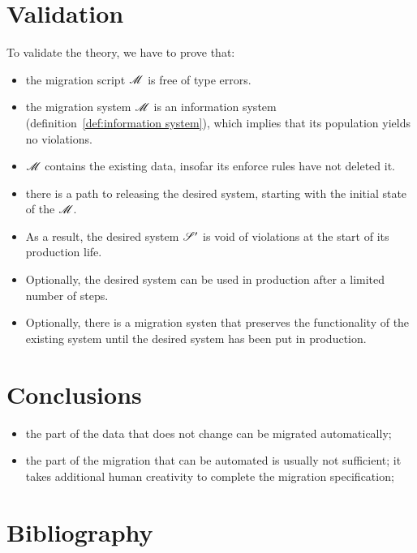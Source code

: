 \documentclass{elsarticle}
\begin{document}
\section{Validation}
   To validate the theory, we have to prove that:
\begin{itemize}
   \item the migration script $\mathscr{M}$ is free of type errors.
   \item the migration system $\mathscr{M}$ is an information system (definition~\ref{def:information system}),
         which implies that its population yields no violations.
   \item $\mathscr{M}$ contains the existing data, insofar its enforce rules have not deleted it.
   \item there is a path to releasing the desired system, starting with the initial state of the $\mathscr{M}$.
   \item As a result, the desired system $\mathscr{S}'$ is void of violations at the start of its production life.
   \item Optionally, the desired system can be used in production after a limited number of steps.
   \item Optionally, there is a migration systen that preserves the functionality of the existing system until the desired system has been put in production.
\end{itemize}

\section{Conclusions}
\begin{itemize}
   \item the part of the data that does not change can be migrated automatically;
   \item the part of the migration that can be automated is usually not sufficient;
         it takes additional human creativity to complete the migration specification;
\end{itemize}
\section{Bibliography}


\end{document}

